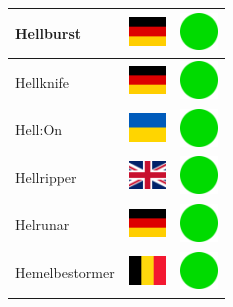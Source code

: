 \documentclass[12pt, a4paper, twoside]{report}
\begin{document}
\begin{center}
\begin{longtable}{|p{5cm}|p{2cm}|p{2cm}|}
Hellburst & \includegraphics[width=1cm]{4x3/de} & \includegraphics[width=1cm]{likes/y} \\ \hline
Hellknife & \includegraphics[width=1cm]{4x3/de} & \includegraphics[width=1cm]{likes/y} \\ \hline
Hell:On & \includegraphics[width=1cm]{4x3/ua} & \includegraphics[width=1cm]{likes/y} \\ \hline
Hellripper & \includegraphics[width=1cm]{4x3/gb} & \includegraphics[width=1cm]{likes/y} \\ \hline
Helrunar & \includegraphics[width=1cm]{4x3/de} & \includegraphics[width=1cm]{likes/y} \\ \hline
Hemelbestormer & \includegraphics[width=1cm]{4x3/be} & \includegraphics[width=1cm]{likes/y} \\ \hline

\end{longtable}
\end{center}
\end{document}
